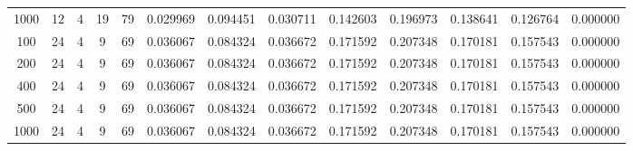\begin{table}[h]
\begin{tabular}{ccccccccccccc}
1000 & 12 & 4 & 19 & 79 & 0.029969 & 0.094451 & 0.030711 & 0.142603 & 0.196973 & 0.138641 & 0.126764 & 0.000000 \\
100 & 24 & 4 & 9 & 69 & 0.036067 & 0.084324 & 0.036672 & 0.171592 & 0.207348 & 0.170181 & 0.157543 & 0.000000 \\
200 & 24 & 4 & 9 & 69 & 0.036067 & 0.084324 & 0.036672 & 0.171592 & 0.207348 & 0.170181 & 0.157543 & 0.000000 \\
400 & 24 & 4 & 9 & 69 & 0.036067 & 0.084324 & 0.036672 & 0.171592 & 0.207348 & 0.170181 & 0.157543 & 0.000000 \\
500 & 24 & 4 & 9 & 69 & 0.036067 & 0.084324 & 0.036672 & 0.171592 & 0.207348 & 0.170181 & 0.157543 & 0.000000 \\
1000 & 24 & 4 & 9 & 69 & 0.036067 & 0.084324 & 0.036672 & 0.171592 & 0.207348 & 0.170181 & 0.157543 & 0.000000 \\
\bottomrule
\end{tabular}
\end{table}
